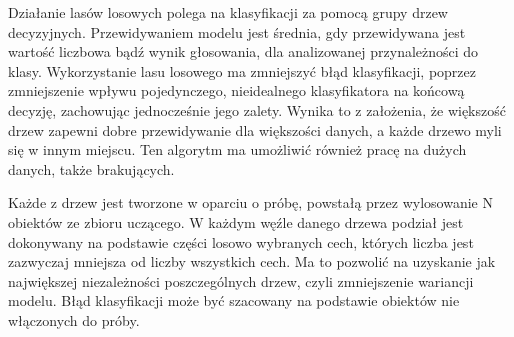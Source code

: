 Działanie lasów losowych polega na klasyfikacji za pomocą grupy drzew decyzyjnych. Przewidywaniem modelu jest średnia, gdy przewidywana jest wartość liczbowa bądź wynik głosowania, dla analizowanej przynależności do klasy. Wykorzystanie lasu losowego ma zmniejszyć błąd klasyfikacji, poprzez zmniejszenie wpływu pojedynczego, nieidealnego klasyfikatora na końcową decyzję, zachowując jednocześnie jego zalety. Wynika
to z założenia, że większość drzew zapewni dobre przewidywanie dla większości danych, a każde
drzewo myli się w innym miejscu. Ten algorytm ma umożliwić również pracę na dużych danych,
także brakujących.

Każde z drzew jest tworzone w oparciu o próbę, powstałą przez wylosowanie N obiektów ze zbioru uczącego. W każdym węźle danego drzewa podział jest dokonywany  na podstawie części losowo wybranych cech, których liczba jest zazwyczaj mniejsza od liczby wszystkich cech. Ma to pozwolić na uzyskanie jak największej niezależności poszczególnych drzew, czyli zmniejszenie wariancji modelu. Błąd klasyfikacji może być szacowany na podstawie obiektów nie
włączonych do próby.



